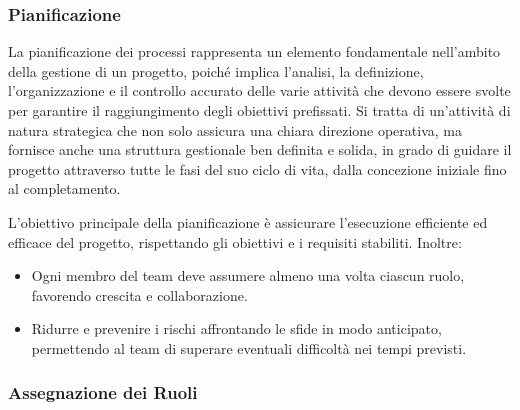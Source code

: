 \subsubsection{Pianificazione}

La pianificazione dei processi rappresenta un elemento fondamentale nell'ambito della gestione di un progetto, poiché implica l'analisi, la definizione, l'organizzazione e il controllo accurato delle varie attività che devono essere svolte per garantire il raggiungimento degli obiettivi prefissati. Si tratta di un'attività di natura strategica che non solo assicura una chiara direzione operativa, ma fornisce anche una struttura gestionale ben definita e solida, in grado di guidare il progetto attraverso tutte le fasi del suo ciclo di vita, dalla concezione iniziale fino al completamento.

L’obiettivo principale della pianificazione è assicurare l'esecuzione efficiente ed efficace del progetto, rispettando gli obiettivi e i requisiti stabiliti. Inoltre:
\begin{itemize}
    \item Ogni membro del team deve assumere almeno una volta ciascun ruolo, favorendo crescita e collaborazione.
    \item Ridurre e prevenire i rischi affrontando le sfide in modo anticipato, permettendo al team di superare eventuali difficoltà nei tempi previsti.
\end{itemize}

\subsubsection{Assegnazione dei Ruoli}

